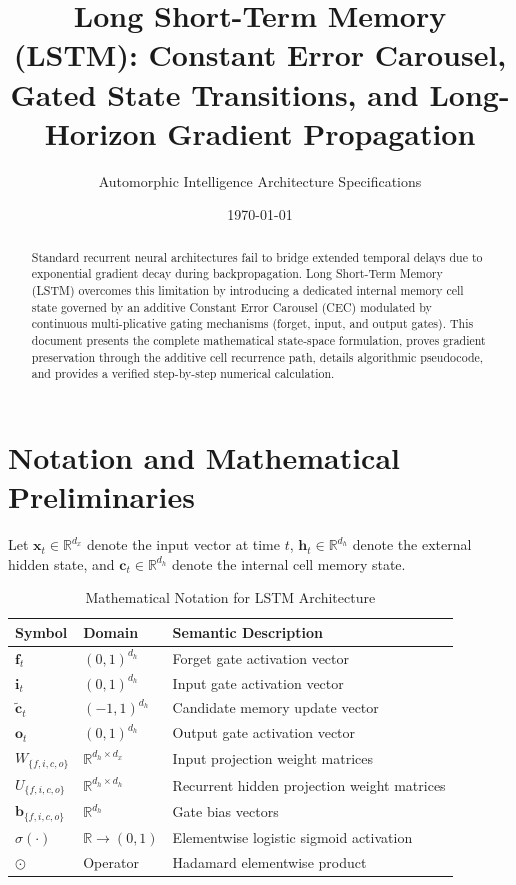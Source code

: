 \documentclass[11pt,a4paper]{article}
\title{Long Short-Term Memory (LSTM): Constant Error Carousel, Gated State Transitions, and Long-Horizon Gradient Propagation}
\author{Automorphic Intelligence Architecture Specifications}
\date{\today}
\theoremstyle{definition}
\begin{document}
\maketitle

\begin{abstract}
Standard recurrent neural architectures fail to bridge extended temporal delays due to exponential gradient decay during backpropagation. Long Short-Term Memory (LSTM) overcomes this limitation by introducing a dedicated internal memory cell state governed by an additive Constant Error Carousel (CEC) modulated by continuous multi-plicative gating mechanisms (forget, input, and output gates). This document presents the complete mathematical state-space formulation, proves gradient preservation through the additive cell recurrence path, details algorithmic pseudocode, and provides a verified step-by-step numerical calculation.
\end{abstract}

\section{Notation and Mathematical Preliminaries}

Let $\mathbf{x}_t \in \mathbb{R}^{d_x}$ denote the input vector at time $t$, $\mathbf{h}_t \in \mathbb{R}^{d_h}$ denote the external hidden state, and $\mathbf{c}_t \in \mathbb{R}^{d_h}$ denote the internal cell memory state.

\begin{table}[h]
\centering
\caption{Mathematical Notation for LSTM Architecture}
\begin{tabular}{lll}
\toprule
\textbf{Symbol} & \textbf{Domain} & \textbf{Semantic Description} \\
\midrule
$\mathbf{f}_t$ & $(0, 1)^{d_h}$ & Forget gate activation vector \\
$\mathbf{i}_t$ & $(0, 1)^{d_h}$ & Input gate activation vector \\
$\tilde{\mathbf{c}}_t$ & $(-1, 1)^{d_h}$ & Candidate memory update vector \\
$\mathbf{o}_t$ & $(0, 1)^{d_h}$ & Output gate activation vector \\
$W_{\{f,i,c,o\}}$ & $\mathbb{R}^{d_h \times d_x}$ & Input projection weight matrices \\
$U_{\{f,i,c,o\}}$ & $\mathbb{R}^{d_h \times d_h}$ & Recurrent hidden projection weight matrices \\
$\mathbf{b}_{\{f,i,c,o\}}$ & $\mathbb{R}^{d_h}$ & Gate bias vectors \\
$\sigma(\cdot)$ & $\mathbb{R} \to (0, 1)$ & Elementwise logistic sigmoid activation \\
$\odot$ & Operator & Hadamard elementwise product \\
\bottomrule
\end{tabular}
\end{table}
\end{document}
